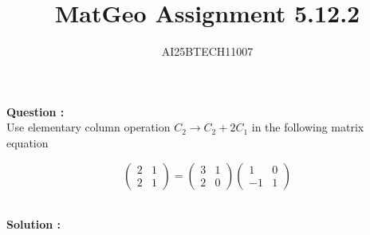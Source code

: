 \documentclass[journal]{IEEEtran}
\begin{document}

\vspace{3cm}

\title{MatGeo Assignment 5.12.2}
\author{AI25BTECH11007}
 \maketitle
{\let\newpage\relax\maketitle}

\renewcommand{\thefigure}{\theenumi}
\renewcommand{\thetable}{\theenumi}
\setlength{\intextsep}{10pt} %


\renewcommand{\thetable}{\theenumi}
\noindent
\textbf{Question :}\\
Use elementary column operation $C_2 \to C_2 + 2C_1$ in the following matrix equation

\[
\begin{pmatrix}
2 & 1 \\
2 & 1
\end{pmatrix}
=
\begin{pmatrix}
3 & 1 \\
2 & 0
\end{pmatrix}
\begin{pmatrix}
1 & 0 \\
-1 & 1
\end{pmatrix}
\]

\noindent\\
\textbf{Solution :}

\end{document}
